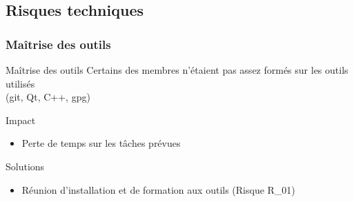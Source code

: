   \subsection{Risques techniques}
    \begin{frame}
      \frametitle{\color{white}Maîtrise des outils}
      \begin{block}{Maîtrise des outils}
        Certains des membres n'étaient pas assez formés sur les outils utilisés\\
        (git, Qt, C++, gpg)
      \end{block}

      \begin{exampleblock}{Impact}
        \begin{itemize}
          \item Perte de temps sur les tâches prévues
        \end{itemize}
      \end{exampleblock}
      
      \begin{exampleblock}{Solutions}
        \begin{itemize}
          \item Réunion d'installation et de formation aux outils (Risque R_01)
        \end{itemize}
      \end{exampleblock}
    \end{frame}

